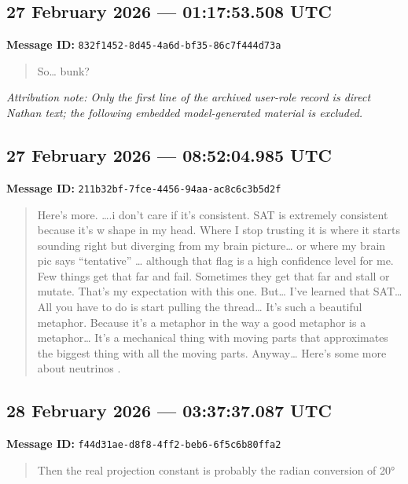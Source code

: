 \documentclass[11pt,letterpaper]{article}
\newcommand{\messageentry}[3]{%
  \Needspace{7\baselineskip}
  \subsection*{#1}
  {\small\textbf{Message ID:} \texttt{#2}}
  \vspace{2pt}
}
\begin{document}
\messageentry{27 February 2026 --- 01:17:53.508 UTC}{832f1452-8d45-4a6d-bf35-86c7f444d73a}{}
\begin{quote}
So… bunk?
\end{quote}
{\small\emph{Attribution note: Only the first line of the archived user-role record is direct Nathan text; the following embedded model-generated material is excluded.}}

\messageentry{27 February 2026 --- 08:52:04.985 UTC}{211b32bf-7fce-4456-94aa-ac8c6c3b5d2f}{}
\begin{quote}
Here’s more. ….i don’t care if it’s consistent. SAT is extremely consistent because it’s w shape in my head. Where I stop trusting it is where it starts sounding right but diverging from my brain picture… or where my brain pic says “tentative” … although that flag is a high confidence level for me. Few things get that far and fail. Sometimes they get that far and stall or mutate. That’s my expectation with this one. But… I’ve learned that SAT… All you have to do is start pulling the thread… It’s such a beautiful metaphor. Because it’s a metaphor in the way a good metaphor is a metaphor… It’s a mechanical thing with moving parts that approximates the biggest thing with all the moving parts. Anyway… Here’s some more about neutrinos .
\end{quote}

\messageentry{28 February 2026 --- 03:37:37.087 UTC}{f44d31ae-d8f8-4ff2-beb6-6f5c6b80ffa2}{}
\begin{quote}
Then the real projection constant is probably the radian conversion of 20°
\end{quote}
\end{document}
